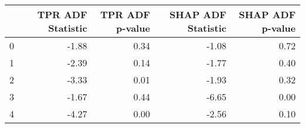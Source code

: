 \begin{tabular}{lrrrr}
\toprule
 & TPR ADF Statistic & TPR ADF p-value & SHAP ADF Statistic & SHAP ADF p-value \\
\midrule
0 & -1.88 & 0.34 & -1.08 & 0.72 \\
1 & -2.39 & 0.14 & -1.77 & 0.40 \\
2 & -3.33 & 0.01 & -1.93 & 0.32 \\
3 & -1.67 & 0.44 & -6.65 & 0.00 \\
4 & -4.27 & 0.00 & -2.56 & 0.10 \\
\bottomrule
\end{tabular}
